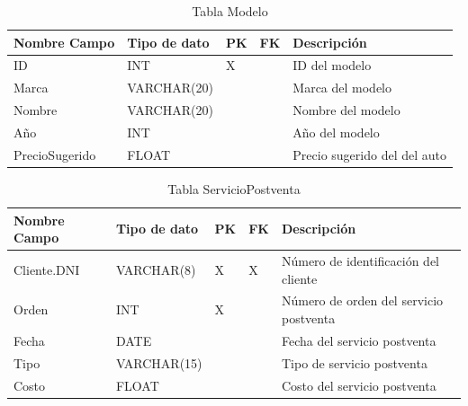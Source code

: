 \documentclass[12pt]{article}
\begin{document}
\begin{table}[htbp]
    \begin{center}
        \begin{tabular}{|p{3cm}|p{3cm}|p{1cm}|p{1cm}|p{6cm}|}
            \hline
            Nombre Campo & Tipo de dato & PK & FK & Descripción \\
            \hline
            ID & INT & X &  & ID del modelo \\
            Marca & VARCHAR(20) &  &  & Marca del modelo \\
            Nombre & VARCHAR(20) &  &  & Nombre del modelo \\
            Año & INT &  &  & Año del modelo \\
            PrecioSugerido & FLOAT &  &  & Precio sugerido del del auto\\
            \hline
        \end{tabular}
        \caption{Tabla Modelo}
            \end{center}
\end{table}


\begin{table}[htbp]
    \begin{center}
        \begin{tabular}{|p{3cm}|p{3cm}|p{1cm}|p{1cm}|p{6cm}|}
            \hline
            Nombre Campo & Tipo de dato & PK & FK & Descripción \\
            \hline
            Cliente.DNI & VARCHAR(8) & X & X & Número de identificación del cliente \\
            Orden & INT & X &  & Número de orden del servicio postventa \\
            Fecha & DATE &  &  & Fecha del servicio postventa \\
            Tipo & VARCHAR(15) &  &  & Tipo de servicio postventa \\
            Costo & FLOAT &  &  & Costo del servicio postventa \\
            \hline
        \end{tabular}
        \caption{Tabla ServicioPostventa}
            \end{center}
\end{table}
\end{document}
